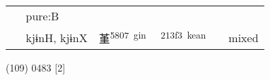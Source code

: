 \documentclass[14pt,a4paper]{scrartcl}
\begin{document}
\begin{longtable}[c]{@{}llllll@{}}
\begin{minipage}[t]{0.14\columnwidth}\raggedright\strut
\strut\end{minipage} &
\begin{minipage}[t]{0.14\columnwidth}\raggedright\strut
pure:B
\strut\end{minipage}\tabularnewline
\begin{minipage}[t]{0.14\columnwidth}\raggedright\strut
𦻍
\strut\end{minipage} &
\begin{minipage}[t]{0.14\columnwidth}\raggedright\strut
kjɨnH, kjɨnX
\strut\end{minipage} &
\begin{minipage}[t]{0.14\columnwidth}\raggedright\strut
堇\textsuperscript{5807~gin}
\strut\end{minipage} &
\begin{minipage}[t]{0.14\columnwidth}\raggedright\strut
𡏳\textsuperscript{213f3~kean}
\strut\end{minipage} &
\begin{minipage}[t]{0.14\columnwidth}\raggedright\strut
\strut\end{minipage} &
\begin{minipage}[t]{0.14\columnwidth}\raggedright\strut
mixed
\strut\end{minipage}\tabularnewline
\bottomrule
\end{longtable}

(109) 0483 {[}2{]}
\end{document}
